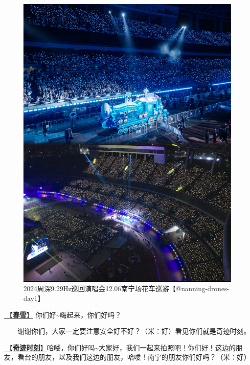 \documentclass[]{ctexbook}
\begin{document}
\begin{figure}

{\centering \includegraphics[width=350pt]{img/nanning20241206/003} 

}

\caption{2024周深9.29Hz巡回演唱会12.06南宁场花车巡游【@nanning-drones-day1】}\label{fig:unnamed-chunk-152}
\end{figure}

\hyperref[spring-snow]{🎵【\textbf{春雪}】} 你们好\textasciitilde 嗨起来，你们好吗？

  谢谢你们，大家一定要注意安全好不好？（米：好）看见你们就是奇迹时刻。

\hyperref[magic-moment]{🎵【\textbf{奇迹时刻}】}哈喽，你们好吗\textasciitilde 大家好，我们一起来拍照吧！你们好！这边的朋友，看台的朋友，以及我们这边的朋友，哈喽！南宁的朋友你们好吗？（米：好）
\end{document}
